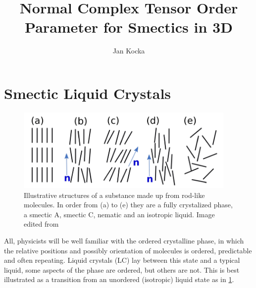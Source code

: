 \documentclass[12pt]{article}
\begin{document}
\title{Normal Complex Tensor Order Parameter for Smectics in 3D}
\author{Jan Kocka}

\begin{abstract}
    \lipsum[10]
\end{abstract}

\maketitle

\personalstatement
\acknowledgments

\maintext

\section{Smectic Liquid Crystals}\label{sec:intro}
    \begin{figure}[t]
        \begin{center}
            \includegraphics[width=0.95\textwidth]{figures/phases.pdf}
        \end{center}
        \caption{
            Illustrative structures of a substance made up from rod-like molecules.
            In order from (a) to (e) they are a fully crystalized phase, a smectic A, smectic C, nematic and an isotropic liquid.
            Image edited from
        }\label{fig:phases}
    \end{figure}
    All, physicists will be well familiar with the ordered crystalline phase, in which the relative positions and possibly orientation of molecules is ordered, predictable and often repeating.
    Liquid crystals (LC) lay between this state and a typical liquid, some aspects of the phase are ordered, but others are not.
    This is best illustrated as a transition from an unordered (isotropic) liquid state as in \cref{fig:phases}.
\end{document}

